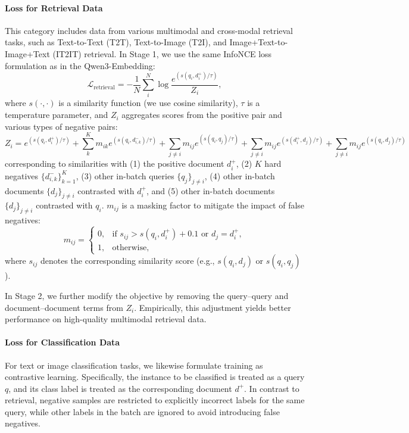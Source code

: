 \documentclass{article} %
\begin{document}
\paragraph{Loss for Retrieval Data} This category includes data from various multimodal and cross-modal retrieval tasks, such as Text-to-Text (T2T), Text-to-Image (T2I), and Image+Text-to-Image+Text (IT2IT) retrieval.
In Stage 1, we use the same InfoNCE loss~\citep{oord2018representation} formulation as in the Qwen3-Embedding:
\begin{equation}
\label{loss:retrieval}
    \mathcal{L}_\textrm{retrieval} = - \frac{1}{N} \sum_i^N \log\frac{e^{(s(q_i, d_i^+)/\tau)}}{Z_i},
\end{equation}
where $s(\cdot, \cdot)$ is a similarity function (we use cosine similarity), $\tau$ is a temperature parameter, and $Z_i$ aggregates scores from the positive pair and various types of negative pairs:
\begin{equation*}
    Z_i = e^{(s(q_i, d_i^+) / \tau)}  + \sum_k^K m_{ik}e^{(s(q_i, d_{i,k}^-)/\tau)} + \sum_{j\neq i} m_{ij}e^{(s(q_i, q_j) / \tau)} + \sum_{j\neq i} m_{ij}e^{(s(d_i^+, d_j) / \tau)} + \sum_{j\neq i} m_{ij}e^{(s(q_i, d_j) / \tau)} 
\end{equation*}
corresponding to similarities with (1) the positive document $d_i^+$, (2) $K$ hard negatives $\{d_{i,k}^-\}_{k=1}^{K}$, (3) other in-batch queries $\{q_j\}_{j\neq i}$, (4) other in-batch documents $\{d_j\}_{j\neq i}$ contrasted with $d_i^+$, and (5) other in-batch documents $\{d_j\}_{j\neq i}$ contrasted with $q_i$. 
$m_{ij}$ is a masking factor to mitigate the impact of false negatives:
\begin{equation*}
m_{ij}=
\begin{cases}
0, & \text{if } s_{ij} > s(q_i,d_i^+) + 0.1 \text{ or } d_j = d_i^+,\\
1, & \text{otherwise},
\end{cases}
\end{equation*}
where $s_{ij}$ denotes the corresponding similarity score (e.g., $s(q_i,d_j)$ or $s(q_i,q_j)$).

In Stage 2, we further modify the objective by removing the query--query and document--document terms from $Z_i$. Empirically, this adjustment yields better performance on high-quality multimodal retrieval data.


\paragraph{Loss for Classification Data} For text or image classification tasks, we likewise formulate training as contrastive learning. Specifically, the instance to be classified is treated as a query $q$, and its class label is treated as the corresponding document $d^+$. In contrast to retrieval, negative samples are restricted to explicitly incorrect labels for the same query, while other labels in the batch are ignored to avoid introducing false negatives.
\end{document}
